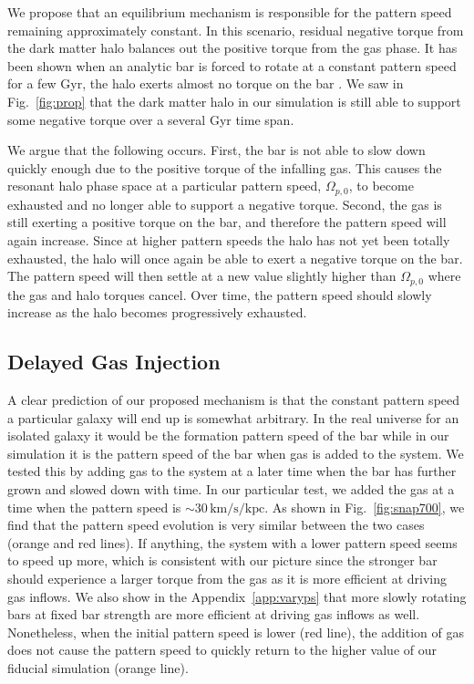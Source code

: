 \documentclass[fleqn,usenatbib]{mnras}
\begin{document}
We propose that an equilibrium mechanism is responsible for the pattern speed
remaining approximately constant. In this scenario, residual negative torque
from the dark matter halo balances out the positive torque from the gas phase.
It has been shown when an analytic bar is forced to rotate at a constant pattern
speed for a few Gyr, the halo exerts almost no torque on the bar
\citep{2022MNRAS.513..768C}. We saw in Fig.~\ref{fig:prop} that the dark matter
halo in our simulation is still able to support some negative torque over a
several Gyr time span.

We argue that the following occurs. First, the bar is not able to slow down
quickly enough due to the positive torque of the infalling gas. This causes
the resonant halo phase space at a particular pattern speed, $\Omega_{p,0}$,
to become exhausted and no longer able to support a negative torque. Second,
the gas is still exerting a positive torque on the bar, and therefore the
pattern speed will again increase. Since at higher pattern speeds the halo has
not yet been totally exhausted, the halo will once again be able to exert a
negative torque on the bar. The pattern speed will then settle at a new value
slightly higher than $\Omega_{p,0}$ where the gas and halo torques cancel.
Over time, the pattern speed should slowly increase as the halo becomes
progressively exhausted.

\subsection{Delayed Gas Injection}
A clear prediction of our proposed mechanism is that the constant pattern speed
a particular galaxy will end up is somewhat arbitrary. In the real universe for
an isolated galaxy it would be the formation pattern speed of the bar while in
our simulation it is the pattern speed of the bar when gas is added to the
system. We tested this by adding gas to the system at a later time when the bar
has further grown and slowed down with time. In our particular test, we added
the gas at a time when the pattern speed is
$\sim30\,\textrm{km}/\textrm{s}/\textrm{kpc}$. As shown in
Fig.~\ref{fig:snap700}, we find that the pattern speed evolution is very similar
between the two cases (orange and red lines). If anything, the system with a
lower pattern speed seems to speed up more, which is consistent with our picture
since the stronger bar should experience a larger torque from the gas as it is
more efficient at driving gas inflows. We also show in the
Appendix~\ref{app:varyps} that more slowly rotating bars at fixed bar strength
are more efficient at driving gas inflows as well. Nonetheless, when the initial
pattern speed is lower (red line), the addition of gas does not cause the
pattern speed to quickly return to the higher value of our fiducial simulation
(orange line).
\end{document}
